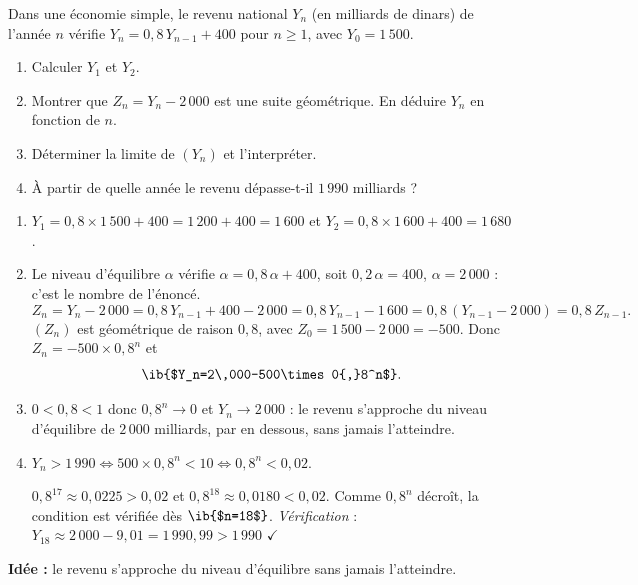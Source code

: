 
Dans une économie simple, le revenu national $Y_n$ (en milliards de dinars) de l'année $n$ vérifie $Y_n=0{,}8\,Y_{n-1}+400$ pour $n\ge1$, avec $Y_0=1\,500$.

\begin{enumerate}
  \item Calculer $Y_1$ et $Y_2$.
  \item Montrer que $Z_n=Y_n-2\,000$ est une suite géométrique. En déduire $Y_n$ en fonction de $n$.
  \item Déterminer la limite de $(Y_n)$ et l'interpréter.
  \item À partir de quelle année le revenu dépasse-t-il $1\,990$ milliards ?
\end{enumerate}

\begin{enumerate}
  \item $Y_1=0{,}8\times1\,500+400=1\,200+400=1\,600$ et $Y_2=0{,}8\times1\,600+400=1\,680$.
  \item Le niveau d'équilibre $\alpha$ vérifie $\alpha=0{,}8\,\alpha+400$, soit $0{,}2\,\alpha=400$, $\alpha=2\,000$ : c'est le nombre de l'énoncé.
  $$Z_n=Y_n-2\,000=0{,}8\,Y_{n-1}+400-2\,000=0{,}8\,Y_{n-1}-1\,600=0{,}8\,(Y_{n-1}-2\,000)=0{,}8\,Z_{n-1}.$$
  $(Z_n)$ est géométrique de raison $0{,}8$, avec $Z_0=1\,500-2\,000=-500$. Donc $Z_n=-500\times0{,}8^n$ et
  $$ \ib{$Y_n=2\,000-500\times0{,}8^n$}.$$
  \item $0<0{,}8<1$ donc $0{,}8^n\to0$ et $Y_n\to2\,000$ : le revenu s'approche du niveau d'équilibre de $2\,000$ milliards, par en dessous, sans jamais l'atteindre.
  \item $Y_n>1\,990\iff500\times0{,}8^n<10\iff0{,}8^n<0{,}02$.

  $0{,}8^{17}\approx0{,}0225>0{,}02$ et $0{,}8^{18}\approx0{,}0180<0{,}02$. Comme $0{,}8^n$ décroît, la condition est vérifiée dès $\ib{$n=18$}$. \emph{Vérification} : $Y_{18}\approx2\,000-9{,}01=1\,990{,}99>1\,990$ $\checkmark$
\end{enumerate}

\textbf{Idée :} le revenu s'approche du niveau d'équilibre sans jamais l'atteindre.
